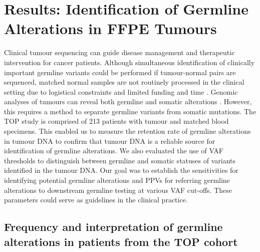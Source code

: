 
\chapter{Results: Identification of Germline Alterations in FFPE Tumours}
\label{ch:Results:IdentificationofGermlineAlterationsinFFPETumours}

Clinical tumour sequencing can guide disease management and therapeutic intervention for cancer patients. Although simultaneous identification of clinically important germline variants could be performed if tumour-normal pairs are sequenced, matched normal samples are not routinely processed in the clinical setting due to logistical constraints and limited funding and time \cite{Frampton2013, Fumagalli2010, Lin2014, Wong2014a}. Genomic analyses of tumours can reveal both germline and somatic alterations \cite{Schrader2015, Jones2015a, Meric-Bernstam2016, Bombard2014, WcWhinney2009}. However, this requires a method to separate germline variants from somatic mutations. The TOP study is comprised of 213 patients with tumour and matched blood specimens. This enabled us to measure the retention rate of germline alterations in tumour DNA to confirm that tumour DNA is a reliable source for identification of germline alterations. We also evaluated the use of VAF thresholds to distinguish between germline and somatic statuses of variants identified in the tumour DNA. Our goal was to establish the sensitivities for identifying potential germline alterations and PPVs for referring germline alterations to downstream germline testing at various VAF cut-offs. These parameters could serve as guidelines in the clinical practice.

\section{Frequency and interpretation of germline alterations in patients from the TOP cohort}
\label{sec:FrequencyandinterpretationofgermlinealterationsinpatientsfromtheTOPcohort}

